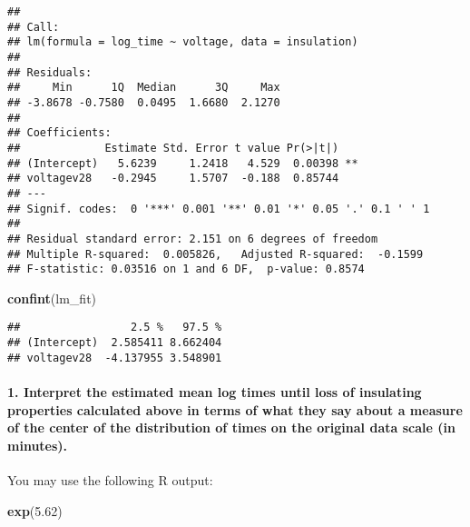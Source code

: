 \documentclass[]{article}
\newenvironment{Shaded}{\begin{snugshade}}{\end{snugshade}}
\newcommand{\FloatTok}[1]{\textcolor[rgb]{0.00,0.00,0.81}{#1}}
\newcommand{\KeywordTok}[1]{\textcolor[rgb]{0.13,0.29,0.53}{\textbf{#1}}}
\newcommand{\NormalTok}[1]{#1}
\let\oldparagraph\paragraph
\renewcommand{\paragraph}[1]{\oldparagraph{#1}\mbox{}}
\begin{document}
\begin{verbatim}
## 
## Call:
## lm(formula = log_time ~ voltage, data = insulation)
## 
## Residuals:
##     Min      1Q  Median      3Q     Max 
## -3.8678 -0.7580  0.0495  1.6680  2.1270 
## 
## Coefficients:
##             Estimate Std. Error t value Pr(>|t|)   
## (Intercept)   5.6239     1.2418   4.529  0.00398 **
## voltagev28   -0.2945     1.5707  -0.188  0.85744   
## ---
## Signif. codes:  0 '***' 0.001 '**' 0.01 '*' 0.05 '.' 0.1 ' ' 1
## 
## Residual standard error: 2.151 on 6 degrees of freedom
## Multiple R-squared:  0.005826,   Adjusted R-squared:  -0.1599 
## F-statistic: 0.03516 on 1 and 6 DF,  p-value: 0.8574
\end{verbatim}

\begin{Shaded}
\begin{Highlighting}[]
\KeywordTok{confint}\NormalTok{(lm_fit)}
\end{Highlighting}
\end{Shaded}

\begin{verbatim}
##                 2.5 %   97.5 %
## (Intercept)  2.585411 8.662404
## voltagev28  -4.137955 3.548901
\end{verbatim}

\newpage

\hypertarget{interpret-the-estimated-mean-log-times-until-loss-of-insulating-properties-calculated-above-in-terms-of-what-they-say-about-a-measure-of-the-center-of-the-distribution-of-times-on-the-original-data-scale-in-minutes.}{%
\paragraph{1. Interpret the estimated mean log times until loss of
insulating properties calculated above in terms of what they say about a
measure of the center of the distribution of times on the original data
scale (in
minutes).}\label{interpret-the-estimated-mean-log-times-until-loss-of-insulating-properties-calculated-above-in-terms-of-what-they-say-about-a-measure-of-the-center-of-the-distribution-of-times-on-the-original-data-scale-in-minutes.}}

You may use the following R output:

\begin{Shaded}
\begin{Highlighting}[]
\KeywordTok{exp}\NormalTok{(}\FloatTok{5.62}\NormalTok{)}
\end{Highlighting}
\end{Shaded}
\end{document}
